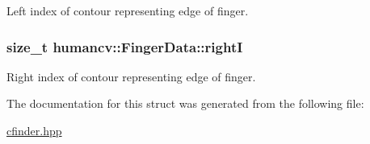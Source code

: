 Left index of contour representing edge of finger. 

\hypertarget{structhumancv_1_1_finger_data_a00ef4dc86d46d741a289e61dcf396bb3}{
\subsubsection[{right\-I}]{\setlength{\rightskip}{0pt plus 5cm}size\-\_\-t {\bf humancv\-::\-Finger\-Data\-::right\-I}}}\label{structhumancv_1_1_finger_data_a00ef4dc86d46d741a289e61dcf396bb3}


Right index of contour representing edge of finger. 



The documentation for this struct was generated from the following file\-:\begin{DoxyCompactItemize}
\item 
\hyperlink{cfinder_8hpp}{cfinder.\-hpp}\end{DoxyCompactItemize}
